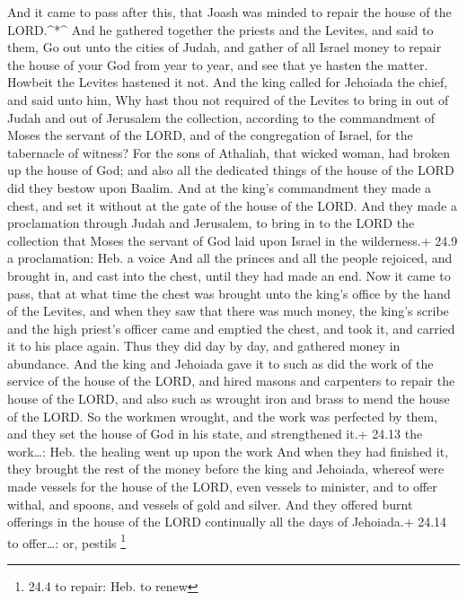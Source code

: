  And it came to pass after this, that Joash was minded to
repair the house of the LORD.\^{}*\^{}  And he gathered
together the priests and the Levites, and said to them, Go out unto the
cities of Judah, and gather of all Israel money to repair the house of
your God from year to year, and see that ye hasten the matter. Howbeit
the Levites hastened it not.  And the king called for
Jehoiada the chief, and said unto him, Why hast thou not required of the
Levites to bring in out of Judah and out of Jerusalem the collection,
according to the commandment of Moses the servant of the LORD, and of
the congregation of Israel, for the tabernacle of witness? 
For the sons of Athaliah, that wicked woman, had broken up the house of
God; and also all the dedicated things of the house of the LORD did they
bestow upon Baalim.  And at the king's commandment they made
a chest, and set it without at the gate of the house of the LORD.
 And they made a proclamation through Judah and Jerusalem,
to bring in to the LORD the collection that Moses the servant of God
laid upon Israel in the wilderness.+ 24.9 a proclamation: Heb. a voice
 And all the princes and all the people rejoiced, and
brought in, and cast into the chest, until they had made an end.
 Now it came to pass, that at what time the chest was
brought unto the king's office by the hand of the Levites, and when they
saw that there was much money, the king's scribe and the high priest's
officer came and emptied the chest, and took it, and carried it to his
place again. Thus they did day by day, and gathered money in abundance.
 And the king and Jehoiada gave it to such as did the work
of the service of the house of the LORD, and hired masons and carpenters
to repair the house of the LORD, and also such as wrought iron and brass
to mend the house of the LORD.  So the workmen wrought, and
the work was perfected by them, and they set the house of God in his
state, and strengthened it.+ 24.13 the work\ldots: Heb. the healing went
up upon the work  And when they had finished it, they
brought the rest of the money before the king and Jehoiada, whereof were
made vessels for the house of the LORD, even vessels to minister, and to
offer withal, and spoons, and vessels of gold and silver. And they
offered burnt offerings in the house of the LORD continually all the
days of Jehoiada.+ 24.14 to offer\ldots: or, pestils \footnote{24.4 to
  repair: Heb. to renew}

